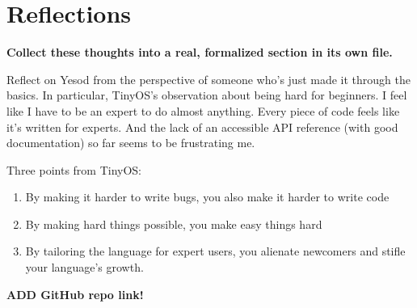 \documentclass{article}
\newcommand {\todo}[1] {{\textbf{\color{red}#1}}}
\begin{document}
\section{Reflections}

\todo{Collect these thoughts into a real, formalized section in its own file.}

Reflect on Yesod from the perspective of someone who's just made it through the basics. In particular, TinyOS's observation about being hard for beginners. I feel like I have to be an expert to do almost anything. Every piece of code feels like it's written for experts. And the lack of an accessible API reference (with good documentation) so far seems to be frustrating me.

Three points from TinyOS:
\begin{enumerate}
  \item By making it harder to write bugs, you also make it harder to write code
  \item By making hard things possible, you make easy things hard
  \item By tailoring the language for expert users, you alienate newcomers and stifle your language's growth.
\end{enumerate}
% 
% 
% 
% 

\todo{ADD GitHub repo link!}
\printbibliography
\end{document}
